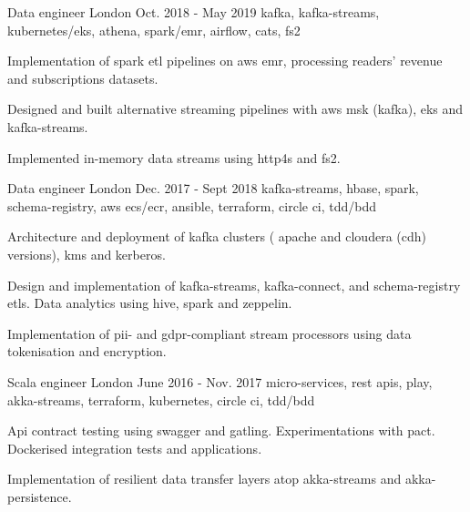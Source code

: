 \begin{cventries}
  \cventry
    {Data engineer} %
    {} %
    {London} %
    {Oct. 2018 - May 2019} %
    {kafka, kafka-streams, kubernetes/eks, athena, spark/emr, airflow, cats, fs2} %
    {
      \begin{cvitems} %
        \item {Implementation of spark etl pipelines on aws emr, processing readers' revenue and subscriptions datasets.}
        \item {Designed and built alternative streaming pipelines with aws msk (kafka), eks and kafka-streams.}
        \item {Implemented in-memory data streams using http4s and fs2.}
      \end{cvitems}
    }

  \cventry
    {Data engineer} %
    {} %
    {London} %
    {Dec. 2017 - Sept 2018} %
    {kafka-streams, hbase, spark, schema-registry, aws ecs/ecr, ansible, terraform, circle ci, tdd/bdd} %
    {
      \begin{cvitems} %
        \item {Architecture and deployment of kafka clusters ( apache and cloudera (cdh) versions), kms and kerberos.}
        \item {Design and implementation of kafka-streams, kafka-connect, and schema-registry etls. Data analytics using hive, spark and zeppelin.}
        \item {Implementation of pii- and gdpr-compliant stream processors using data tokenisation and encryption.}
      \end{cvitems}
    }

  \cventry
    {Scala engineer} %
    {} %
    {London} %
    {June 2016 - Nov. 2017} %
    {micro-services, rest apis, play, akka-streams, terraform, kubernetes, circle ci, tdd/bdd} %
    {
      \begin{cvitems} %
        \item {Api contract testing using swagger and gatling. Experimentations with pact. Dockerised integration tests and applications.}
        \item {Implementation of resilient data transfer layers atop akka-streams and akka-persistence.}
      \end{cvitems}
    }


\end{cventries}
